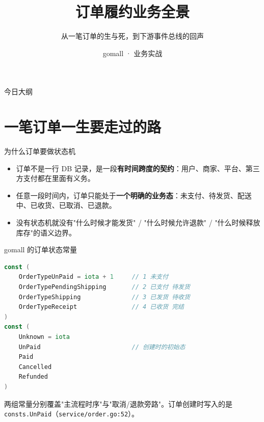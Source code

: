 

\title{订单履约业务全景}
\subtitle{从一笔订单的生与死，到下游事件总线的回声}
\author{gomall · 业务实战}
\date{}



\maketitle

\begin{frame}{今日大纲}
\tableofcontents
\end{frame}

\section{一笔订单一生要走过的路}

\begin{frame}{为什么订单要做状态机}
\begin{itemize}
  \item 订单不是一行 DB 记录，是一段\textbf{有时间跨度的契约}：用户、商家、平台、第三方支付都在里面有义务。
  \item 任意一段时间内，订单只能处于\textbf{一个明确的业务态}：未支付、待发货、配送中、已收货、已取消、已退款。
  \item 没有状态机就没有"什么时候才能发货" / "什么时候允许退款" / "什么时候释放库存"的语义边界。
\end{itemize}
\vspace{2mm}
\end{frame}

\begin{frame}[fragile]{gomall 的订单状态常量}
\begin{lstlisting}[language=Go,firstnumber=3,
  caption={\srcnote{consts/order.go:3--16}}]
const (
    OrderTypeUnPaid = iota + 1     // 1 未支付
    OrderTypePendingShipping       // 2 已支付 待发货
    OrderTypeShipping              // 3 已发货 待收货
    OrderTypeReceipt               // 4 已收货 完结
)
const (
    Unknown = iota
    UnPaid                         // 创建时的初始态
    Paid
    Cancelled
    Refunded
)
\end{lstlisting}
\small 两组常量分别覆盖"主流程时序"与"取消/退款旁路"。订单创建时写入的是 \texttt{consts.UnPaid}（\texttt{service/order.go:52}）。
\end{frame}

